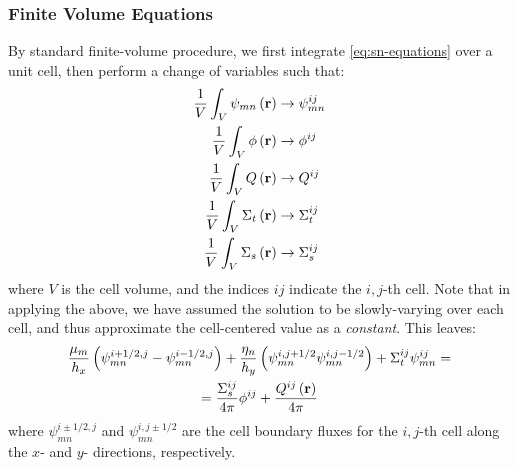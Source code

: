 \begin{frame}[allowframebreaks]
  \frametitle{Finite Volume Equations}
  By standard finite-volume procedure, we first integrate \cref{eq:sn-equations} over a unit cell, then perform a change of variables such that:
  \begin{align}
    \frac{1}{V}\int_{V}\psi_{mn}\left(\mathbf{r}\right) & \rightarrow \psi_{mn}^{ij} \\
    \frac{1}{V}\int_{V}\phi\left(\mathbf{r}\right)      & \rightarrow \phi^{ij}      \\
    \frac{1}{V}\int_{V}Q\left(\mathbf{r}\right)         & \rightarrow Q^{ij}         \\
    \frac{1}{V}\int_{V}\Sigma_t\left(\mathbf{r}\right)  & \rightarrow \Sigma_t^{ij}  \\
    \frac{1}{V}\int_{V}\Sigma_s\left(\mathbf{r}\right)  & \rightarrow \Sigma_s^{ij}
  \end{align}
  where $V$ is the cell volume, and the indices $ij$ indicate the $i,j$-th cell.
  Note that in applying the above, we have assumed the solution to be slowly-varying over each cell, and thus approximate the cell-centered value as a \textit{constant}.
  This leaves:
  \begin{multline}\label{eq:fv-eqs}
    \frac{\mu_{m}}{h_x}\left(\psi_{mn}^{i+1/2,j}-\psi_{mn}^{i-1/2,j}\right)+\frac{\eta_{n}}{h_y}\left(\psi_{mn}^{i,j+1/2}\-\psi_{mn}^{i,j-1/2}\right) + \Sigma_t ^{ij}\psi_{mn}^{ij} =\\=\frac{\Sigma_s^{ij}}{4\pi}\phi^{ij} + \frac{Q^{ij}\left(\mathbf{r}\right)}{4\pi}
  \end{multline}
  where $\psi_{mn}^{i\pm1/2,j}$ and $\psi_{mn}^{i,j\pm1/2}$ are the cell boundary fluxes for the $i,j$-th cell along the $x$- and $y$- directions, respectively.
\end{frame}